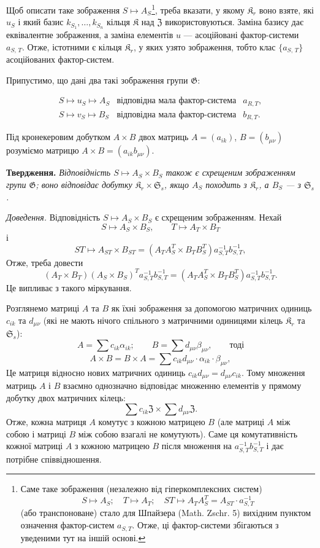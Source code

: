 \documentclass[11pt]{article}
\newcommand{\srcfn}[2]{\footnote{#2}}
\begin{document}
Щоб описати таке зображення \(S\mapsto A_S\)\srcfn{1}{Саме таке зображення (незалежно від гіперкомплексних систем)
\[
S\mapsto A_S;\quad T\mapsto A_T;\quad ST\mapsto A_TA_S^T=A_{ST}\cdot a_{S,T}^{-1}
\]
(або транспоноване) стало для Шпайзера (Math. Zschr. 5) вихідним пунктом означення фактор-систем \(a_{S,T}\). Отже, ці фактор-системи збігаються з уведеними тут на іншій основі.}, треба вказати, у якому \(\mathfrak K_r\) воно взяте, які \(u_S\) і який базис \(k_{S_1},\ldots,k_{S_n}\) кільця \(\mathfrak K\) над \(\mathfrak Z\) використовуються. Заміна базису дає еквівалентне зображення, а заміна елементів \(u\) --- асоційовані фактор-системи \(a_{S,\,T}\). Отже, істотними є кільця \(\mathfrak K_r\), у яких узято зображення, тобто клас \(\{a_{S,\,T}\}\) асоційованих фактор-систем.

Припустимо, що дані два такі зображення групи \(\mathfrak G\):

\[
\begin{array}{lll}
S\mapsto u_S\mapsto A_S & \text{відповідна мала фактор-система} & a_{R,T},\\
S\mapsto v_S\mapsto B_S & \text{відповідна мала фактор-система} & b_{R,T}.
\end{array}
\]

Під кронекеровим добутком \(A\times B\) двох матриць \(A=(a_{ik})\), \(B=(b_{\mu\nu})\) розуміємо матрицю \(A\times B=(a_{ik}b_{\mu\nu})\).

\noindent\textbf{Твердження.} \emph{Відповідність \(S\mapsto A_S\times B_S\) також є схрещеним зображенням групи \(\mathfrak G\); воно відповідає добутку \(\mathfrak K_r\times\mathfrak S_s\), якщо \(A_S\) походить з \(\mathfrak K_r\), а \(B_S\) --- з \(\mathfrak S_s\).}

\noindent\emph{Доведення.} Відповідність \(S\mapsto A_S\times B_S\) є схрещеним зображенням. Нехай
\[
S\mapsto A_S\times B_S,\qquad T\mapsto A_T\times B_T
\]
і
\[
ST\mapsto A_{ST}\times B_{ST}
=(A_TA_S^T\times B_TB_S^T)a_{S,T}^{-1}b_{S,T}^{-1},
\]
Отже, треба довести
\[
(A_T\times B_T)(A_S\times B_S)^T a_{S,T}^{-1}b_{S,T}^{-1}
=(A_TA_S^T\times B_TB_S^T)a_{S,T}^{-1}b_{S,T}^{-1}.
\]
Це випливає з такого міркування.

Розглянемо матриці \(A\) та \(B\) як їхні зображення за допомогою матричних одиниць \(c_{ik}\) та \(d_{\mu\nu}\) (які не мають нічого спільного з матричними одиницями кілець \(\mathfrak K_r\) та \(\mathfrak S_s\)):
\[
A=\sum c_{ik}\alpha_{ik};\qquad
B=\sum d_{\mu\nu}\beta_{\mu\nu},\qquad\text{тоді}
\]
\[
A\times B=B\times A
=\sum c_{ik}d_{\mu\nu}\cdot\alpha_{ik}\cdot\beta_{\mu\nu},
\]
Це матриця відносно нових матричних одиниць \(c_{ik}d_{\mu\nu}=d_{\mu\nu}c_{ik}\). Тому множення матриць \(A\) і \(B\) взаємно однозначно відповідає множенню елементів у прямому добутку двох матричних кілець:
\[
\sum c_{ik}\mathfrak Z\times\sum d_{\mu\nu}\mathfrak Z.
\]
Отже, кожна матриця \(A\) комутує з кожною матрицею \(B\) (але матриці \(A\) між собою і матриці \(B\) між собою взагалі не комутують). Саме ця комутативність кожної матриці \(A\) з кожною матрицею \(B\) після множення на \(a_{S,T}^{-1}b_{S,T}^{-1}\) і дає потрібне співвідношення.
\end{document}

